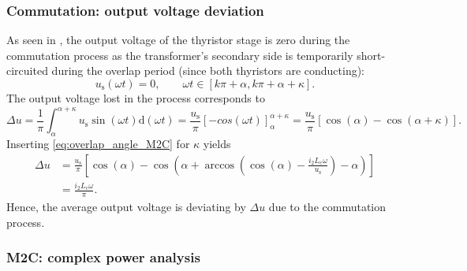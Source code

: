 \begin{frame}[c]
    \frametitle{Commutation: output voltage deviation}
    As seen in , the output voltage of the thyristor stage is zero during the commutation process as the transformer's secondary side is temporarily short-circuited during the overlap period (since both thyristors are conducting):
    \begin{equation}
        u_\mathrm{s}(\omega t) = 0, \qquad \omega t \in [k\pi+\alpha, k\pi+\alpha + \kappa].
    \end{equation}
    The output voltage lost in the process corresponds to
    \begin{equation}
        \Delta u = \frac{1}{\pi}\int_{\alpha}^{\alpha + \kappa} u_\mathrm{s}\sin(\omega t) \mathrm{d}(\omega t) = \frac{u_\mathrm{s}}{\pi}\left[-cos(\omega t)\right]_{\alpha}^{\alpha + \kappa} = \frac{u_\mathrm{s}}{\pi}\left[\cos(\alpha) - \cos(\alpha + \kappa)\right].
    \end{equation}
    Inserting \eqref{eq:overlap_angle_M2C} for $\kappa$ yields
    \begin{equation}
        \begin{split}
            \Delta u &= \frac{u_\mathrm{s}}{\pi}\left[\cos(\alpha) - \cos\left(\alpha + \arccos\left(\cos(\alpha) - \frac{i_2L_\mathrm{c}\omega}{u_\mathrm{s}}\right) - \alpha\right)\right]\\
                     &=\frac{i_2L_\mathrm{c}\omega}{\pi}.
        \end{split}
    \end{equation}
    Hence, the average output voltage is deviating by $\Delta u$ due to the commutation process.
\end{frame}

\begin{frame}[c]
    \frametitle{M2C: complex power analysis}
\end{frame}